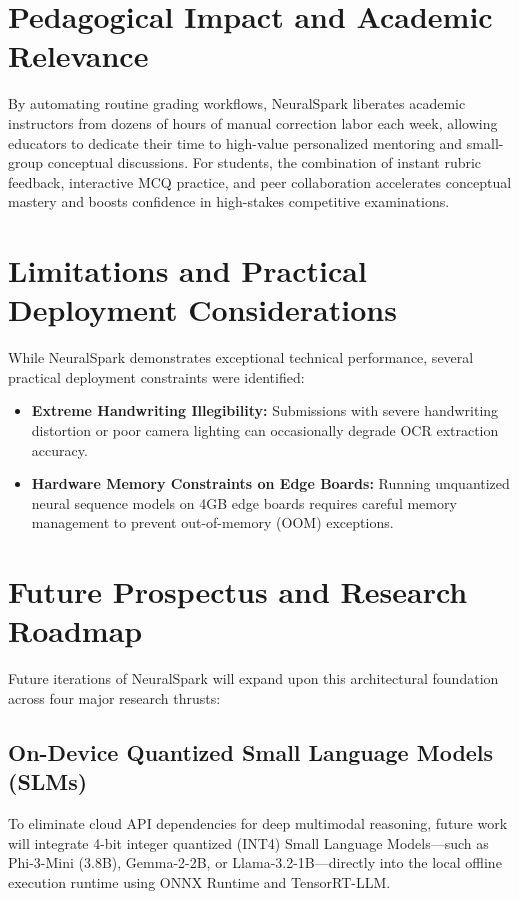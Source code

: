 \section{Pedagogical Impact and Academic Relevance}
By automating routine grading workflows, NeuralSpark liberates academic instructors from dozens of hours of manual correction labor each week, allowing educators to dedicate their time to high-value personalized mentoring and small-group conceptual discussions. For students, the combination of instant rubric feedback, interactive MCQ practice, and peer collaboration accelerates conceptual mastery and boosts confidence in high-stakes competitive examinations.

\section{Limitations and Practical Deployment Considerations}
While NeuralSpark demonstrates exceptional technical performance, several practical deployment constraints were identified:
\begin{itemize}[leftmargin=*]
    \item \textbf{Extreme Handwriting Illegibility:} Submissions with severe handwriting distortion or poor camera lighting can occasionally degrade OCR extraction accuracy.
    \item \textbf{Hardware Memory Constraints on Edge Boards:} Running unquantized neural sequence models on 4GB edge boards requires careful memory management to prevent out-of-memory (OOM) exceptions.
\end{itemize}

\section{Future Prospectus and Research Roadmap}
Future iterations of NeuralSpark will expand upon this architectural foundation across four major research thrusts:

\subsection{On-Device Quantized Small Language Models (SLMs)}
To eliminate cloud API dependencies for deep multimodal reasoning, future work will integrate 4-bit integer quantized (INT4) Small Language Models—such as Phi-3-Mini (3.8B), Gemma-2-2B, or Llama-3.2-1B—directly into the local offline execution runtime using ONNX Runtime and TensorRT-LLM.

